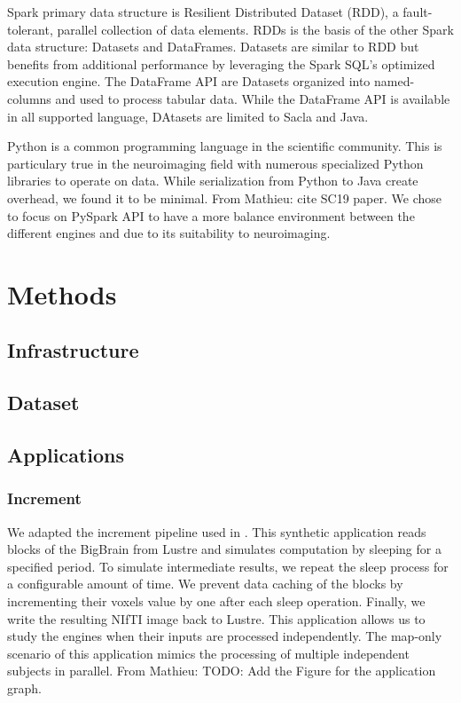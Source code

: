 \documentclass[conference]{IEEEtran}
\newcommand{\MD}[1]{\color{magenta}From Mathieu: #1 \color{black}}
\begin{document}
Spark primary data structure is Resilient Distributed Dataset (RDD)\cite{RDD}, a fault-tolerant, parallel collection of data elements.
RDDs is the basis of the other Spark data structure: Datasets and DataFrames.
Datasets are similar to RDD but benefits from additional performance by leveraging the Spark SQL's optimized execution engine.
The DataFrame API are Datasets organized into named-columns and used to process tabular data.
While the DataFrame API is available in all supported language, DAtasets are limited to Sacla and Java.

Python is a common programming language in the scientific community.
This is particulary true in the neuroimaging field with numerous specialized Python libraries to operate on data.
While serialization from Python to Java create overhead, we found it to be minimal. \MD{cite SC19 paper.}
We chose to focus on PySpark API to have a more balance environment between the different engines and due to its suitability to neuroimaging.

\section{Methods}
\subsection{Infrastructure} %
\subsection{Dataset} %

\subsection{Applications}
\subsubsection{Increment}
We adapted the increment pipeline used in \cite{hayot2019performance}.
This synthetic application reads blocks of the BigBrain from Lustre and simulates computation by sleeping for a specified period.
To simulate intermediate results, we repeat the sleep process for a configurable amount of time.
We prevent data caching of the blocks by incrementing their voxels value by one after each sleep operation.
Finally, we write the resulting NIfTI image back to Lustre.
This application allows us to study the engines when their inputs are processed independently.
The map-only scenario of this application mimics the processing of multiple independent subjects in parallel.
\MD{TODO: Add the Figure for the application graph.}
\end{document}
